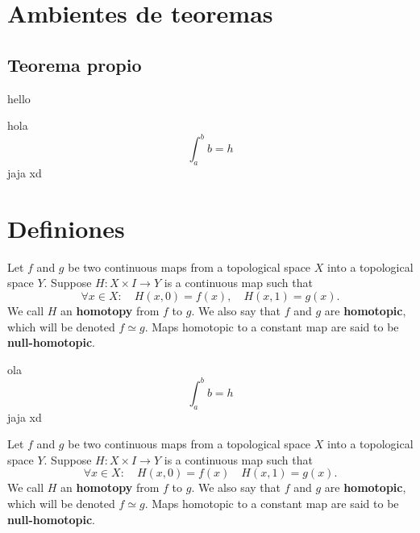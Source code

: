 \section{Ambientes de teoremas}

\lipsum[2]

\subsection{Teorema propio}
hello \lipsum[2]

\begin{theorem}
    hola \[\int_a^b b = h\]
    jaja xd
\end{theorem}

\lipsum[1]

\section{Definiones}

\lipsum[1]

\begin{definition}
    Let \(f\) and \(g\) be two continuous maps from a topological space \(X\) into a topological space \(Y\). Suppose \(H \colon X\times I \to Y\) is a continuous map such that 
    \[
        \forall x\in X :\quad H(x,0) = f(x), \quad H(x,1) = g(x).
    \]
    We call \(H\) an \textbf{homotopy} from \(f\) to \(g\). We also say that \(f\) and \(g\) are \textbf{homotopic}, which will be denoted \(f\simeq g\). Maps homotopic to a constant map are said to be \textbf{null-homotopic}.
\end{definition}

\lipsum[1]

\begin{theorem}ola \[\int_a^b b = h\]
    jaja xd
\end{theorem}

\lipsum[1]

\begin{definition}
    Let \(f\) and \(g\) be two continuous maps from a topological space \(X\) into a topological space \(Y\). Suppose \(H \colon X\times I \to Y\) is a continuous map such that 
    \[
        \forall x\in X :\quad H(x,0) = f(x) \quad H(x,1) = g(x).
    \]
    We call \(H\) an \textbf{homotopy} from \(f\) to \(g\). We also say that \(f\) and \(g\) are \textbf{homotopic}, which will be denoted \(f\simeq g\). Maps homotopic to a constant map are said to be \textbf{null-homotopic}.

\end{definition}

\lipsum[1-2]